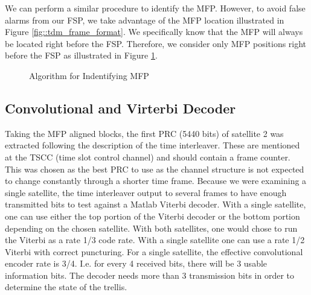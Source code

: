 \documentclass[conference,onecolumn]{IEEEtran}
\begin{document}
We can perform a similar procedure to identify the MFP. However, to avoid false alarms from our FSP, we take advantage of the MFP location illustrated in Figure \ref{fig::tdm_frame_format}. We specifically know that the MFP will always be located right before the FSP. Therefore, we consider only MFP positions right before the FSP as illustrated in Figure \ref{fig::finding_mfp}.

\begin{figure}[H]
	\centerline{}
	\caption{Algorithm for Indentifying MFP}
	\label{fig::finding_mfp}
\end{figure}

\subsection{Convolutional and Virterbi Decoder}


Taking the MFP aligned blocks, the first PRC (5440 bits) of satellite 2 was extracted following the description of the time interleaver.  These are mentioned at the TSCC (time slot control channel) and should contain a frame counter.  This was chosen as the best PRC to use as the channel structure is not expected to change constantly through a shorter time frame.  Because we were examining a single satellite, the time interleaver output to several frames to have enough transmitted bits to test against a Matlab Viterbi decoder.  With a single satellite, one can use either the top portion of the Viterbi decoder or the bottom portion depending on the chosen satellite.  With both satellites, one would chose to run the Viterbi as a rate 1/3 code rate.  With a single satellite one can use a rate 1/2 Viterbi with correct puncturing.  For a single satellite, the effective convolutional encoder rate is 3/4.  I.e. for every 4 received bits, there will be 3 usable information bits.  The decoder needs more than 3 transmission bits in order to determine the state of the trellis.
\end{document}

